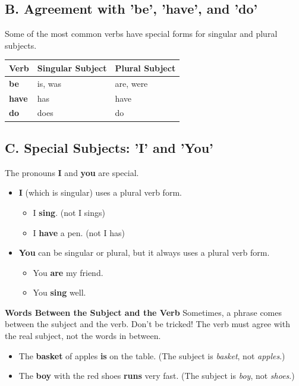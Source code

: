 \subsection*{B. Agreement with 'be', 'have', and 'do'}
Some of the most common verbs have special forms for singular and plural subjects.

\begin{table}[h!]
\centering
\begin{tabular}{|l|l|l|}
\hline
\textbf{Verb} & \textbf{Singular Subject} & \textbf{Plural Subject} \\
\hline
\textbf{be} & is, was & are, were \\
\textbf{have} & has & have \\
\textbf{do} & does & do \\
\hline
\end{tabular}
\end{table}

\subsection*{C. Special Subjects: 'I' and 'You'}
The pronouns \textbf{I} and \textbf{you} are special.
\begin{itemize}
    \item \textbf{I} (which is singular) uses a plural verb form.
    \begin{itemize}
        \item I \textbf{sing}. (not I sings)
        \item I \textbf{have} a pen. (not I has)
    \end{itemize}
    \item \textbf{You} can be singular or plural, but it always uses a plural verb form.
    \begin{itemize}
        \item You \textbf{are} my friend.
        \item You \textbf{sing} well.
    \end{itemize}
\end{itemize}

\begin{warningbox}
    \textbf{Words Between the Subject and the Verb}
    Sometimes, a phrase comes between the subject and the verb. Don't be tricked! The verb must agree with the real subject, not the words in between.
    \begin{itemize}
        \item The \textbf{basket} of apples \textbf{is} on the table. (The subject is \textit{basket}, not \textit{apples}.)
        \item The \textbf{boy} with the red shoes \textbf{runs} very fast. (The subject is \textit{boy}, not \textit{shoes}.)
    \end{itemize}
\end{warningbox}

